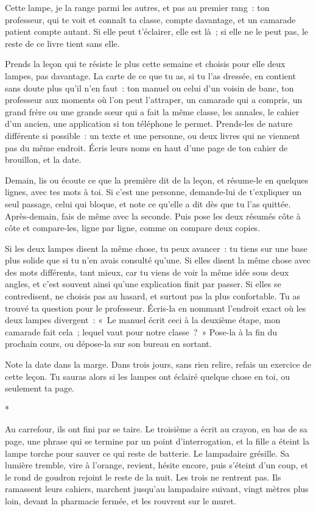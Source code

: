 \documentclass[10.5pt,twoside,openright]{book}
\newcommand{\asterisme}{\par\vspace{0.7em}\centerline{\color{gris}*\quad*\quad*}\vspace{0.7em}\par\noindent}
\newcommand{\soustitre}[1]{\par\vspace{1.1em}\noindent{\bfseries\color{accent}#1}\par\vspace{0.4em}\noindent}
\begin{document}
Cette lampe, je la range parmi les autres, et pas au premier rang : ton professeur, qui te voit et connaît ta classe, compte davantage, et un camarade patient compte autant. Si elle peut t’éclairer, elle est là ; si elle ne le peut pas, le reste de ce livre tient sans elle.

\soustitre{Ce soir, essaie ceci}

Prends la leçon qui te résiste le plus cette semaine et choisis pour elle deux lampes, pas davantage. La carte de ce que tu as, si tu l’as dressée, en contient sans doute plus qu’il n’en faut : ton manuel ou celui d’un voisin de banc, ton professeur aux moments où l’on peut l’attraper, un camarade qui a compris, un grand frère ou une grande sœur qui a fait la même classe, les annales, le cahier d’un ancien, une application si ton téléphone le permet. Prends-les de nature différente si possible : un texte et une personne, ou deux livres qui ne viennent pas du même endroit. Écris leurs noms en haut d’une page de ton cahier de brouillon, et la date.

Demain, lis ou écoute ce que la première dit de la leçon, et résume-le en quelques lignes, avec tes mots à toi. Si c’est une personne, demande-lui de t’expliquer un seul passage, celui qui bloque, et note ce qu’elle a dit dès que tu l’as quittée. Après-demain, fais de même avec la seconde. Puis pose les deux résumés côte à côte et compare-les, ligne par ligne, comme on compare deux copies.

Si les deux lampes disent la même chose, tu peux avancer : tu tiens sur une base plus solide que si tu n’en avais consulté qu’une. Si elles disent la même chose avec des mots différents, tant mieux, car tu viens de voir la même idée sous deux angles, et c’est souvent ainsi qu’une explication finit par passer. Si elles se contredisent, ne choisis pas au hasard, et surtout pas la plus confortable. Tu as trouvé ta question pour le professeur. Écris-la en nommant l’endroit exact où les deux lampes divergent : « Le manuel écrit ceci à la deuxième étape, mon camarade fait cela ; lequel vaut pour notre classe ? » Pose-la à la fin du prochain cours, ou dépose-la sur son bureau en sortant.

Note la date dans la marge. Dans trois jours, sans rien relire, refais un exercice de cette leçon. Tu sauras alors si les lampes ont éclairé quelque chose en toi, ou seulement ta page.

\asterisme

Au carrefour, ils ont fini par se taire. Le troisième a écrit au crayon, en bas de sa page, une phrase qui se termine par un point d’interrogation, et la fille a éteint la lampe torche pour sauver ce qui reste de batterie. Le lampadaire grésille. Sa lumière tremble, vire à l’orange, revient, hésite encore, puis s’éteint d’un coup, et le rond de goudron rejoint le reste de la nuit. Les trois ne rentrent pas. Ils ramassent leurs cahiers, marchent jusqu’au lampadaire suivant, vingt mètres plus loin, devant la pharmacie fermée, et les rouvrent sur le muret.
\end{document}
